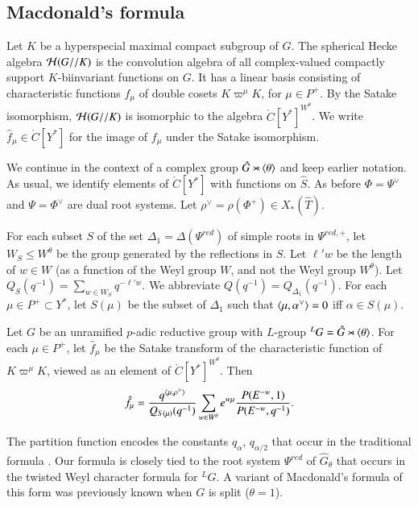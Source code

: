 \subsection{Macdonald's formula}\label{sec:macdonald}

Let $K$ be a hyperspecial maximal compact subgroup of $G$.  The
spherical Hecke algebra $\mathcal H(G//K)$ is the convolution
algebra of all complex-valued compactly support $K$-biinvariant
functions on $G$.  It has a linear basis consisting of characteristic
functions $f_\mu$ of double cosets $K\varpi^\mu K$, for $\mu\in P^+$.
By the Satake isomorphism, $\mathcal H(G//K)$ is isomorphic to the algebra
$\ring{C}[Y^*]^{W^\theta}$.  We write $\hat f_\mu\in \ring{C}[Y^*]$
for the image of $f_\mu$ under the Satake isomorphism.

We continue in the context of a complex group $\hat G \rtimes
\langle{\theta}\rangle$ and keep earlier notation.  As usual, we identify
elements of $\ring{C}[Y^*]$ with functions on $\hat S$.  As before
$\Phi=\Psi^\vee$ and $\Psi = \Phi^\vee$ are dual root systems.  Let
$\rho^\vee = \rho(\Phi^+)\in X_*(\hat T)$.

For each subset $S$ of the set $\Delta_1=\Delta(\Psi^{red})$ of simple roots in
$\Psi^{red,+}$, let $W_S\le W^\theta$ be the group generated by the
reflections in $S$.  Let $\ell' w$ be the length of $w\in W$ (as a
function of the Weyl group $W$, and not the Weyl group $W^\theta$).
Let $Q_S(q^{-1}) = \sum_{w\in W_S} q^{-\ell'w}$.  We abbreviate
$Q(q^{-1}) = Q_{\Delta_1}(q^{-1})$.  For each $\mu\in P^+\subset Y^*$,
let $S(\mu)$ be the subset of $\Delta_1$ such that
$\langle{\mu,\alpha^\vee}\rangle=0$ iff $\alpha\in S(\mu)$.

\begin{theorem}\label{thm:macdonald}
  Let $G$ be an unramified $p$-adic reductive group with $L$-group
  ${}^LG = \hat G \rtimes \langle{\theta}\rangle$.  For each $\mu\in P^+$, let
  $\hat f_\mu$ be the Satake transform of the characteristic function
  of $K\varpi^\mu K$, viewed as an element of
  $\ring{C}[Y^*]^{W^\theta}$.  Then
\[
\hat f_\mu = \frac{q^{\langle{\mu,\rho^\vee}\rangle}}{ Q_{S(\mu)}(q^{-1})} 
\sum_{w\in W^\theta} e^{w\mu} \frac{P(E^{-w},1)}{P(E^{-w},q^{-1})}.
\]
\end{theorem}

The partition function encodes the constants $q_\alpha$,
$q_{\alpha/2}$ that occur in the traditional formula
\cite{macdonaldspherical}.  Our formula is closely tied to the root
system $\Psi^{red}$ of $\hat G_\theta$ that occurs in the twisted Weyl
character formula for ${}^LG$.  
A variant of Macdonald's formula of this form was
previously known when $G$ is split ($\theta=1$).

